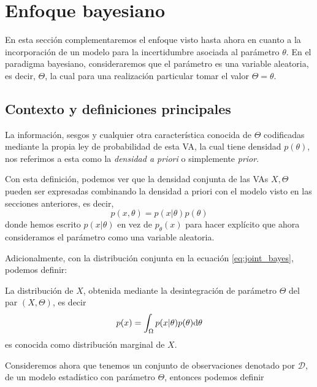 \chapter{Enfoque bayesiano}

En esta sección complementaremos el enfoque visto hasta ahora en cuanto a la incorporación de un modelo para la incertidumbre asociada al parámetro $\theta$. En el paradigma bayesiano, consideraremos que el parámetro es una variable aleatoria, es decir, $\Theta$, la cual para una realización particular tomar el valor $\Theta = \theta$.  
\section{Contexto y definiciones principales}

\begin{definition}
La información, sesgos y cualquier otra característica conocida de $\Theta$ codificadas mediante la propia ley de probabilidad de esta VA, la cual tiene densidad $p(\theta)$, nos referimos a esta como la \emph{densidad a priori} o simplemente \emph{prior}.
\end{definition}

Con esta definición, podemos ver que la densidad conjunta de las VAs $X,\Theta$ pueden ser expresadas combinando la densidad a priori con el modelo visto en las secciones anteriores, es decir, 
\begin{equation}
    p(x,\theta) = p(x|\theta)p(\theta)
    \label{eq:joint_bayes}
\end{equation}
donde hemos escrito $p(x|\theta)$ en vez de $p_\theta(x)$ para hacer explícito que ahora consideramos el parámetro como una variable aleatoria. 

Adicionalmente, con la distribución conjunta en la ecuación \eqref{eq:joint_bayes}, podemos definir:

\begin{definition}
La distribución de $X$, obtenida mediante la desintegración de parámetro $\Theta$ del par $(X,\Theta)$, es decir 
\begin{equation}
    p(x) = \int_\Omega p(x|\theta)p(\theta){\text{d}}\theta
\end{equation}
es conocida como distribución marginal de $X$.
\end{definition}

Consideremos ahora que tenemos un conjunto de observaciones denotado por $\mathcal{D}$, de un modelo estadístico con parámetro $\Theta$, entonces podemos definir

